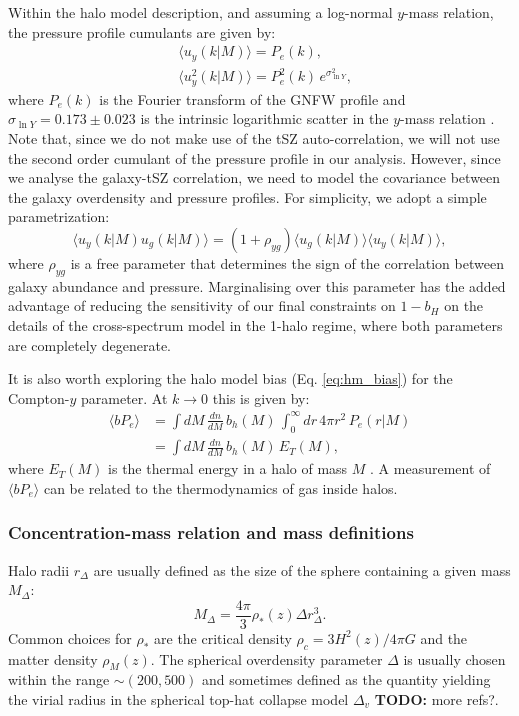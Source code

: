 \documentclass[useAMS,usenatbib]{mn2e}
\newcommand{\TODO}[1]{{\bf TODO:} #1}
\begin{document}
      Within the halo model description, and assuming a log-normal $y$-mass relation, the pressure profile cumulants are given by:
      \begin{align}
        &\langle u_y(k|M)\rangle=P_e(k),\\
        &\langle u_y^2(k|M)\rangle=P_e^2(k)\,e^{\sigma_{\ln Y}^2},
      \end{align}
      where $P_e(k)$ is the Fourier transform of the GNFW profile and $\sigma_{\ln Y}=0.173\pm0.023$ is the intrinsic logarithmic scatter in the $y$-mass relation \cite{2016A&A...594A..24P}. Note that, since we do not make use of the tSZ auto-correlation, we will not use the second order cumulant of the pressure profile in our analysis. However, since we analyse the galaxy-tSZ correlation, we need to model the covariance between the galaxy overdensity and pressure profiles. For simplicity, we adopt a simple parametrization:
      \begin{equation}
        \langle u_y(k|M) u_g(k|M)\rangle = (1+\rho_{yg})\langle u_g(k|M)\rangle \langle u_y(k|M)\rangle,
      \end{equation}
      where $\rho_{yg}$ is a free parameter that determines the sign of the correlation between galaxy abundance and pressure. Marginalising over this parameter has the added advantage of reducing the sensitivity of our final constraints on $1-b_H$ on the details of the cross-spectrum model in the 1-halo regime, where both parameters are completely degenerate.

      It is also worth exploring the halo model bias (Eq. \ref{eq:hm_bias}) for the Compton-$y$ parameter. At $k\rightarrow0$ this is given by:
      \begin{align}\nonumber
        \langle bP_e\rangle&=\int dM\,\frac{dn}{dM}\,b_h(M)\,\int_0^\infty dr\,4\pi r^2\,P_e(r|M)\\
               &=\int dM\,\frac{dn}{dM}\,b_h(M)\,E_T(M),
      \end{align}
      where $E_T(M)$ is the thermal energy in a halo of mass $M$ \cite{2017MNRAS.467.2315V,2019arXiv190413347P}. A measurement of $\langle bP_e\rangle$ can be related to the thermodynamics of gas inside halos.
      
    \subsubsection{Concentration-mass relation and mass definitions}\label{sssec:theory.hm.cm}
      Halo radii $r_\Delta$ are usually defined as the size of the sphere containing a given mass $M_\Delta$:
      \begin{equation}
        M_\Delta = \frac{4\pi}{3}\rho_*(z)\Delta r^3_\Delta.
      \end{equation}
      Common choices for $\rho_*$ are the critical density $\rho_c=3H^2(z)/4\pi G$ and the matter density $\rho_M(z)$. The spherical overdensity parameter $\Delta$ is usually chosen within the range $\sim(200,500)$ and sometimes defined as the quantity yielding the virial radius in the spherical top-hat collapse model $\Delta_v$ \cite{1998ApJ...495...80B} \TODO{more refs?}.
\end{document}
